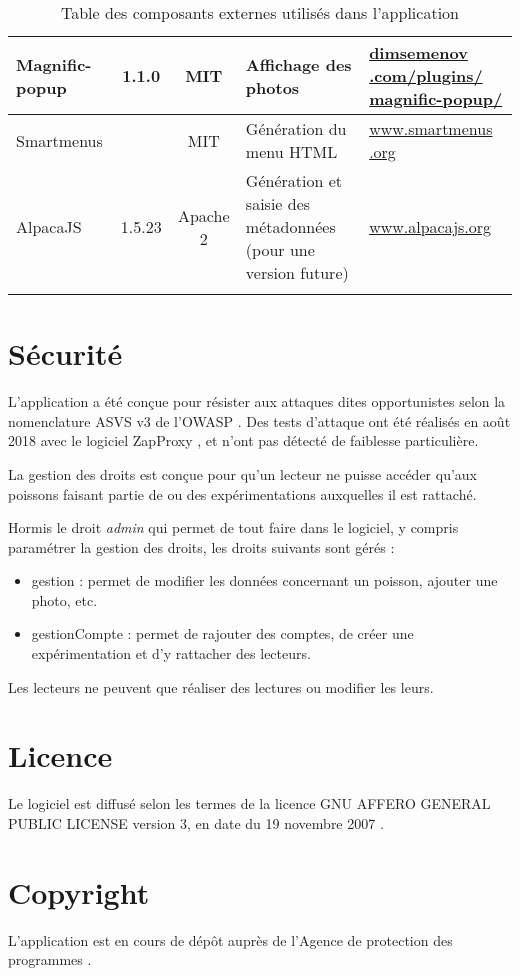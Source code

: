 \begin{longtable}{|>{\raggedright\arraybackslash}p{3cm}|c|c|>{\raggedright\arraybackslash}p{3cm}|>{\raggedright\arraybackslash}p{3cm}|}
\hline 
Magnific-popup & 1.1.0 & MIT & Affichage des photos & \href{http://dimsemenov.com/plugins/magnific-popup/}{dimsemenov .com/plugins/ magnific-popup/}\\ 
\hline 
Smartmenus &  & MIT & Génération du menu HTML & \href{http://www.smartmenus .org}{www.smartmenus .org} \\ 
\hline 
AlpacaJS & 1.5.23 & Apache 2 & Génération et saisie des métadonnées (pour une version future) & 
\href{http://www.alpacajs.org/}{www.alpacajs.org}\\
\hline
\caption{Table des composants externes utilisés dans l'application}
\end{longtable} 

\section{Sécurité}

L'application a été conçue pour résister aux attaques dites opportunistes selon la nomenclature ASVS v3 \cite{asvs} de l'OWASP \cite{owasp}. Des tests d'attaque ont été réalisés en août 2018 avec le logiciel ZapProxy \cite{zaproxy}, et n'ont pas détecté de faiblesse particulière.

La gestion des droits est conçue pour qu'un lecteur ne puisse accéder qu'aux poissons faisant partie de ou des expérimentations auxquelles il est rattaché. 

Hormis le droit \textit{admin} qui permet de tout faire dans le logiciel, y compris paramétrer la gestion des droits, les droits suivants sont gérés :
\begin{itemize}
\item gestion : permet de modifier les données concernant un poisson, ajouter une photo, etc.
\item gestionCompte : permet de rajouter des comptes, de créer une expérimentation et d'y rattacher des lecteurs.
\end{itemize}

Les lecteurs ne peuvent que réaliser des lectures ou modifier les leurs.

\section{Licence}
Le logiciel est diffusé selon les termes de la licence GNU AFFERO GENERAL PUBLIC LICENSE version 3, en date du 19 novembre 2007 \cite{agpl}.

\section{Copyright}

L'application est en cours de dépôt auprès de l'Agence de protection des programmes \cite{app}.

